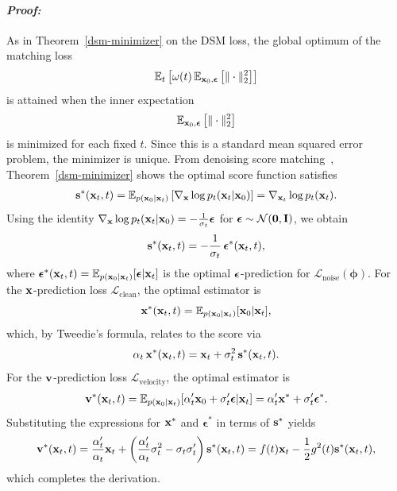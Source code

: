 \paragraph{\textit{Proof:}} 
As in Theorem~\ref{dsm-minimizer} on the DSM loss, the global optimum of the matching loss
\[
\mathbb{E}_t\left[\omega(t)\,\mathbb{E}_{{\mathbf{x}}_0,\bm{\epsilon}}\left[\|\cdot\|_2^2\right]\right]
\]
is attained when the inner expectation
\[
\mathbb{E}_{{\mathbf{x}}_0,\bm{\epsilon}}\left[\|\cdot\|_2^2\right]
\]
is minimized for each fixed $t$. Since this is a standard mean squared error problem, the minimizer is unique.
From denoising score matching~\citep{vincent2011connection}, Theorem~\ref{dsm-minimizer} shows the optimal score function satisfies
\begin{align*}
    {\mathbf{s}}^*({\mathbf{x}}_t,t) = \mathbb{E}_{p({\mathbf{x}}_0|{\mathbf{x}}_t)}\left[\nabla_{{\mathbf{x}}}\log p_t({\mathbf{x}}_t|{\mathbf{x}}_0)\right] = \nabla_{{\mathbf{x}}_t} \log p_t({\mathbf{x}}_t).
\end{align*}
Using the identity $\nabla_{{\mathbf{x}}}\log p_t({\mathbf{x}}_t|{\mathbf{x}}_0) = -\frac{1}{\sigma_t} \bm{\epsilon}$ for $\bm{\epsilon} \sim \mathcal{N}(\bm{0},{\mathbf{I}})$, we obtain
\begin{align*}
    {\mathbf{s}}^*({\mathbf{x}}_t,t) = -\frac{1}{\sigma_t}\, \bm{\epsilon}^*({\mathbf{x}}_t,t),
\end{align*}
where $\bm{\epsilon}^*({\mathbf{x}}_t,t) = \mathbb{E}_{p({\mathbf{x}}_0|{\mathbf{x}}_t)}[\bm{\epsilon}|{\mathbf{x}}_t]$ is the optimal ${\bm{\epsilon}}$-prediction for $\mathcal{L}_{\text{noise}}({\bm{\phi}})$.
For the ${\mathbf{x}}$-prediction loss $\mathcal{L}_{\text{clean}}$, the optimal estimator is
\[
{\mathbf{x}}^*({\mathbf{x}}_t,t) = \mathbb{E}_{p({\mathbf{x}}_0|{\mathbf{x}}_t)}[{\mathbf{x}}_0|{\mathbf{x}}_t],
\]
which, by Tweedie's formula, relates to the score via
\[
\alpha_t\, {\mathbf{x}}^*({\mathbf{x}}_t,t) = {\mathbf{x}}_t + \sigma_t^2\, {\mathbf{s}}^*({\mathbf{x}}_t,t).
\]
For the ${\mathbf{v}}$-prediction loss $\mathcal{L}_{\text{velocity}}$, the optimal estimator is
\begin{align*}
    {\mathbf{v}}^*({\mathbf{x}}_t,t) = \mathbb{E}_{p({\mathbf{x}}_0|{\mathbf{x}}_t)}[\alpha_t' {\mathbf{x}}_0 + \sigma_t' \bm{\epsilon}|{\mathbf{x}}_t] 
    = \alpha_t' {\mathbf{x}}^* + \sigma_t' \bm{\epsilon}^*.
\end{align*}
Substituting the expressions for ${\mathbf{x}}^*$ and $\bm{\epsilon}^*$ in terms of ${\mathbf{s}}^*$ yields
\begin{align*}
    {\mathbf{v}}^*({\mathbf{x}}_t,t)
    = \frac{\alpha_t'}{\alpha_t} {\mathbf{x}}_t + \left( \frac{\alpha_t'}{\alpha_t} \sigma_t^2 - \sigma_t \sigma_t' \right) {\mathbf{s}}^*({\mathbf{x}}_t,t) = f(t) {\mathbf{x}}_t - \frac{1}{2}g^2(t) {\mathbf{s}}^*({\mathbf{x}}_t,t),
\end{align*}
which completes the derivation.


